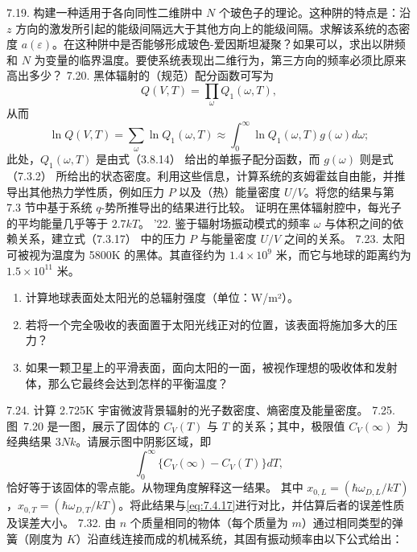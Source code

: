 7.19. 构建一种适用于各向同性二维阱中 \(N\) 个玻色子的理论。这种阱的特点是：沿 \(z\) 方向的激发所引起的能级间隔远大于其他方向上的能级间隔。求解该系统的态密度 \(a(\varepsilon)\)。在这种阱中是否能够形成玻色-爱因斯坦凝聚？如果可以，求出以阱频和 \(N\) 为变量的临界温度。要使系统表现出二维行为，第三方向的频率必须比原来高出多少？
7.20. 黑体辐射的（规范）配分函数可写为
\begin{equation}\tag{7.5.60}\label{eq:7.5.60}
Q ( V , T ) = \prod _ { \omega } Q _ { 1 } ( \omega , T ) ,
\end{equation}
从而
\begin{equation}\tag{7.5.61}\label{eq:7.5.61}
\ln Q ( V , T ) = \sum _ { \omega } \ln Q _ { 1 } ( \omega , T ) \approx \int _ { 0 } ^{\infty} \ln Q _ { 1 } ( \omega , T ) g ( \omega ) d \omega ;
\end{equation}
此处，\(Q_{1}(\omega,T)\) 是由式（3.8.14） 给出的单振子配分函数，而 \(g(\omega)\) 则是式（7.3.2） 所给出的状态密度。利用这些信息，计算系统的亥姆霍兹自由能，并推导出其他热力学性质，例如压力 \(P\) 以及（热）能量密度 \(U/V\)。将您的结果与第 7.3 节中基于系统 \(q\)-势所推导出的结果进行比较。
证明在黑体辐射腔中，每光子的平均能量几乎等于 \(2.7kT\)。
'22. 鉴于辐射场振动模式的频率 \(\omega\) 与体积之间的依赖关系，建立式（7.3.17） 中的压力 \(P\) 与能量密度 \(U/V\) 之间的关系。
7.23. 太阳可被视为温度为 5800K 的黑体。其直径约为 \(1.4 \times 10^{9}\) 米，而它与地球的距离约为 \(1.5 \times 10^{11}\) 米。
\begin{enumerate}
\def\labelenumi{(\alph{enumi})}
\item
  计算地球表面处太阳光的总辐射强度（单位：W/m²）。
\item
  若将一个完全吸收的表面置于太阳光线正对的位置，该表面将施加多大的压力？
\item
  如果一颗卫星上的平滑表面，面向太阳的一面，被视作理想的吸收体和发射体，那么它最终会达到怎样的平衡温度？
\end{enumerate}
7.24. 计算 2.725K 宇宙微波背景辐射的光子数密度、熵密度及能量密度。
7.25. 图~7.20 是一图，展示了固体的 \(C_{V}(T)\) 与 \(T\) 的关系；其中，极限值 \(C_{V}(\infty)\) 为经典结果 \(3Nk\)。请展示图中阴影区域，即
\begin{equation}\tag{7.5.62}\label{eq:7.5.62}
\int _ { 0 } ^{\infty} \{ C _ { V } ( \infty ) - C _ { V } ( T ) \} d T ,
\end{equation}
恰好等于该固体的零点能。从物理角度解释这一结果。
其中 \(x_{0,L} = (\hbar\omega_{D,L}/kT)\)，\(x_{0,T} = (\hbar\omega_{D,T}/kT)\)。将此结果与\autoref{eq:7.4.17}进行对比，并估算后者的误差性质及误差大小。
7.32. 由 \(n\) 个质量相同的物体（每个质量为 \(m\)）通过相同类型的弹簧（刚度为 \(K\)）沿直线连接而成的机械系统，其固有振动频率由以下公式给出：
